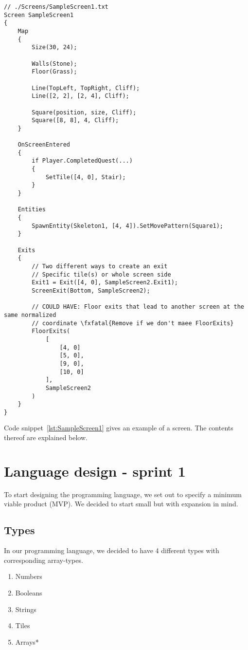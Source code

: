 \begin{lstlisting}[caption={Example screen}, label={lst:SampleScreen1},escapechar=|]
// ./Screens/SampleScreen1.txt
Screen SampleScreen1 
{
    Map 
    {
        Size(30, 24);

        Walls(Stone); 
        Floor(Grass);

        Line(TopLeft, TopRight, Cliff);
        Line([2, 2], [2, 4], Cliff);

        Square(position, size, Cliff);
        Square([8, 8], 4, Cliff);
    }

    OnScreenEntered
    {
        if Player.CompletedQuest(...) 
        {
            SetTile([4, 0], Stair);
        }
    }

    Entities
    {
        SpawnEntity(Skeleton1, [4, 4]).SetMovePattern(Square1);
    }
    
    Exits 
    {
        // Two different ways to create an exit
        // Specific tile(s) or whole screen side
        Exit1 = Exit([4, 0], SampleScreen2.Exit1);
        ScreenExit(Bottom, SampleScreen2);
    
        // COULD HAVE: Floor exits that lead to another screen at the same normalized 
        // coordinate \fxfatal{Remove if we don't maee FloorExits}
        FloorExits(  
            [ 
                [4, 0] 
                [5, 0], 
                [9, 0], 
                [10, 0] 
            ],
            SampleScreen2
        )
    }
}
\end{lstlisting}

Code snippet~\ref{lst:SampleScreen1} gives an example of a screen. The contents thereof are explained below.

\section{Language design - sprint 1}

To start designing the programming language, we set out to specify a minimum viable product (MVP). We decided to start small but with expansion in mind.

\subsection{Types}
In our programming language, we decided to have 4 different types with corresponding array-types.

\begin{multicols}{3}
\begin{enumerate}
    \item Numbers\label{item:numbertype}
    \item Booleans\label{item:booleantype}
    \item Strings\label{item:stringtype}
    \item Tiles\label{item:tiletype}
    \item Arrays*\label{item:arraytype}
\end{enumerate}
\end{multicols}

